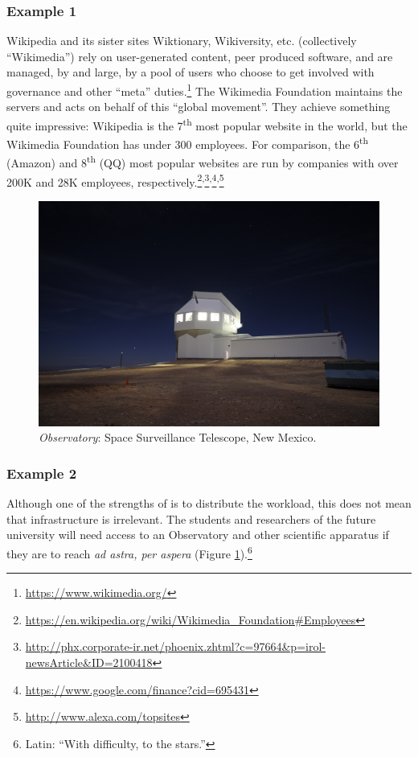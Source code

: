 \subsubsection*{Example 1} Wikipedia and its sister sites Wiktionary, Wikiversity, etc. (collectively ``Wikimedia'') rely on user-generated content,
peer produced software, and are managed, by and large, by a pool of users who choose to
get involved with governance and other ``meta'' duties.\footnote{\url{https://www.wikimedia.org/}}
%
The Wikimedia Foundation maintains the servers and acts on behalf of
this ``global movement''.  They achieve something quite impressive:
Wikipedia is the 7\textsuperscript{th} most popular website in the
world, but the Wikimedia Foundation has under 300 employees.  For
comparison, the 6\textsuperscript{th} (Amazon) and
8\textsuperscript{th} (QQ) most popular websites are run by companies
with over 200K and 28K employees,
respectively.\footnote{\url{https://en.wikipedia.org/wiki/Wikimedia_Foundation\#Employees}}\textsuperscript{,}\footnote{\url{http://phx.corporate-ir.net/phoenix.zhtml?c=97664&p=irol-newsArticle&ID=2100418}}\textsuperscript{,}\footnote{\url{https://www.google.com/finance?cid=695431}}\textsuperscript{,}\footnote{\url{http://www.alexa.com/topsites}}


\begin{figure}
\vspace{-.6cm}
\begin{center}
\includegraphics[width=.48\textwidth,trim=0 170 0 250, clip=true]{Space_Surveillance_Telescope}
\end{center}
\vspace{-.5cm}
\captionsetup{font=footnotesize,width=.48\textwidth}
\caption{\textsl{Observatory}: Space Surveillance Telescope, New Mexico.
\label{space-surveillance}}
\vspace{-1.1cm}
\end{figure}

\subsubsection*{Example 2} Although one of the strengths of  is to
distribute the workload, this does not mean that infrastructure is
irrelevant.  The students and
researchers of the future university will need access to an
Observatory and other scientific apparatus if they are to
reach \emph{ad astra, per aspera} (Figure \ref{space-surveillance}).\footnote{Latin: ``With difficulty, to the stars.''}

